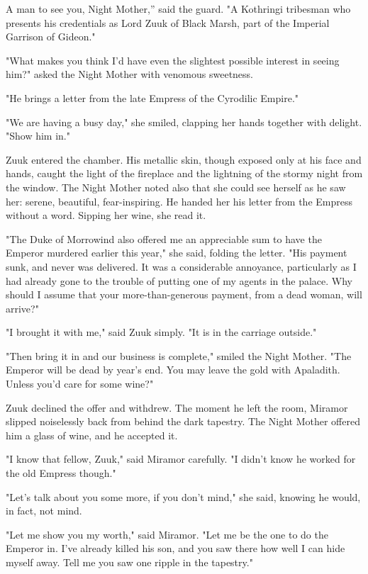 \clearpage
{}

\dropcap A man to see you, Night Mother,'' said the guard. "A Kothringi tribesman who presents his credentials as Lord Zuuk of Black Marsh, part of the Imperial Garrison of Gideon."

"What makes you think I'd have even the slightest possible interest in seeing him?" asked the Night Mother with venomous sweetness.

"He brings a letter from the late Empress of the Cyrodilic Empire."

"We are having a busy day," she smiled, clapping her hands together with delight. "Show him in."

Zuuk entered the chamber. His metallic skin, though exposed only at his face and hands, caught the light of the fireplace and the lightning of the stormy night from the window. The Night Mother noted also that she could see herself as he saw her: serene, beautiful, fear-inspiring. He handed her his letter from the Empress without a word. Sipping her wine, she read it.

"The Duke of Morrowind also offered me an appreciable sum to have the Emperor murdered earlier this year," she said, folding the letter. "His payment sunk, and never was delivered. It was a considerable annoyance, particularly as I had already gone to the trouble of putting one of my agents in the palace. Why should I assume that your more-than-generous payment, from a dead woman, will arrive?"

"I brought it with me," said Zuuk simply. "It is in the carriage outside."

"Then bring it in and our business is complete," smiled the Night Mother. "The Emperor will be dead by year's end. You may leave the gold with Apaladith. Unless you'd care for some wine?"

Zuuk declined the offer and withdrew. The moment he left the room, Miramor slipped noiselessly back from behind the dark tapestry. The Night Mother offered him a glass of wine, and he accepted it.

"I know that fellow, Zuuk," said Miramor carefully. "I didn't know he worked for the old Empress though."

"Let's talk about you some more, if you don't mind," she said, knowing he would, in fact, not mind.

"Let me show you my worth," said Miramor. "Let me be the one to do the Emperor in. I've already killed his son, and you saw there how well I can hide myself away. Tell me you saw one ripple in the tapestry."


